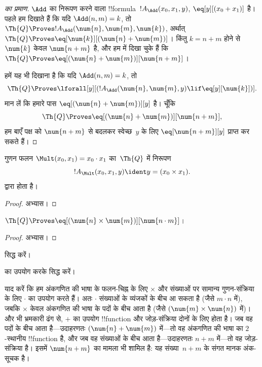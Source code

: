 \documentclass[../../../include/open-logic-section]{subfiles}
\begin{document}
\begin{proof}[ का प्रमाण]
$\Add$ का निरूपण करने वाला !!{formula}~$!A_\Add(x_0, x_1, y)$,
$\eq[y][(x_0 + x_1)]$ है। पहले हम दिखाते हैं कि यदि $\Add(n, m) = k$, तो
$\Th{Q} \Proves !A_\Add(\num{n}, \num{m}, \num{k})$, अर्थात्
$\Th{Q} \Proves \eq[\num{k}][(\num{n} + \num{m})]$। किंतु
$k = n + m$ होने से $\num{k}$ केवल $\num{n+m}$ है, और हम
 में दिखा चुके हैं कि
$\Th{Q} \Proves \eq[(\num{n} + \num{m})][\num{n+m}]$।

हमें यह भी दिखाना है कि यदि $\Add(n, m) = k$, तो
\[
\Th{Q} \Proves \lforall[y][(!A_\Add(\num{n}, \num{m}, y) \lif
  \eq[y][\num{k}])].
\]
मान लें कि हमारे पास $\eq[(\num{n} + \num{m})][y]$ है। चूँकि
\[
\Th{Q} \Proves \eq[(\num{n}+\num{m})][\num{n+m}],
\]
हम बाएँ पक्ष को $\num{n+m}$ से बदलकर स्वेच्छ~$y$ के लिए
$\eq[\num{n+m}][y]$ प्राप्त कर सकते हैं।
\end{proof}

\begin{prop}
गुणन फलन $\Mult(x_0, x_1) = x_0 \cdot x_1$ का~$\Th{Q}$ में निरूपण
\[
  !A_{\Mult}(x_0, x_1, y) \ident y = (x_0 \times x_1).
\]
द्वारा होता है।
\end{prop}

\begin{proof} अभ्यास। \end{proof}

\begin{lem}
$\Th{Q} \Proves \eq[(\num{n} \times \num{m})][\num{n \cdot m}]$।
\end{lem}

\begin{proof} अभ्यास। \end{proof}

\begin{prob}
 सिद्ध करें।
\end{prob}

\begin{prob}
 का उपयोग करके
 सिद्ध करें।
\end{prob}

\begin{explain}
  याद करें कि हम अंकगणित की भाषा के फलन-चिह्न के लिए $\times$ और संख्याओं
  पर सामान्य गुणन-संक्रिया के लिए $\cdot$ का उपयोग करते हैं। अतः $\cdot$
  संख्याओं के व्यंजकों के बीच आ सकता है (जैसे $m \cdot n$ में), जबकि
  $\times$ केवल अंकगणित की भाषा के पदों के बीच आता है (जैसे
  $(\num{m} \times \num{n})$ में)। और भी भ्रमकारी ढंग से, $+$ का उपयोग
  !!{function} और जोड़-संक्रिया दोनों के लिए होता है। जब वह पदों के बीच
  आता है---उदाहरणतः $(\num{n} + \num{m})$ में---तो वह अंकगणित की भाषा का
  $2$-स्थानीय !!{function} है, और जब वह संख्याओं के बीच आता है---उदाहरणतः
  $n+m$ में---तो वह जोड़-संक्रिया है। इसमें $\num{n+m}$ का मामला भी शामिल
  है: यह संख्या~$n+m$ के संगत मानक अंक-सूचक है।
\end{explain}
\end{document}
